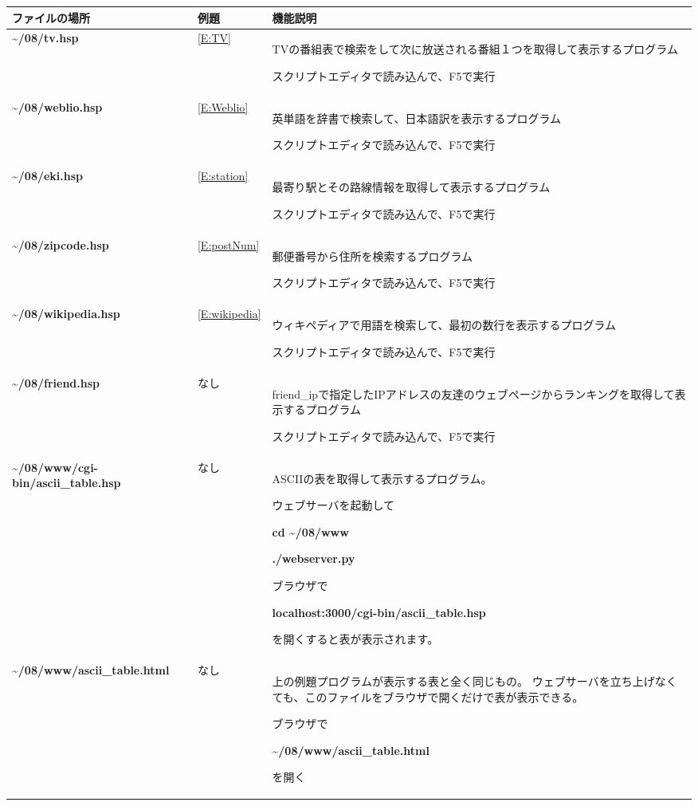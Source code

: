 \documentclass[a4paper,12pt,dvipdfmx]{jarticle}
\begin{document}
\begin{flushleft}
\tablefirsthead{}
\tablehead{}
\tabletail{}
\tablelasttail{}
\begin{supertabular}{|m{6.7730002cm}|m{2.042cm}|m{7.5810003cm}|}
\hline
ファイルの場所 &
例題 &
機能説明\\\hline
	\textbf{\~{}/08/tv.hsp} &
\ref*{E:TV} &
TVの番組表で検索をして次に放送される番組１つを取得して表示するプログラム

スクリプトエディタで読み込んで、F5で実行\\\hline
	\textbf{\~{}/08/weblio.hsp} &
\ref*{E:Weblio} &
英単語を辞書で検索して、日本語訳を表示するプログラム

スクリプトエディタで読み込んで、F5で実行\\\hline
	\textbf{\~{}/08/eki.hsp} &
\ref*{E:station} &
最寄り駅とその路線情報を取得して表示するプログラム

スクリプトエディタで読み込んで、F5で実行\\\hline
	\textbf{\~{}/08/zipcode.hsp} &
\ref*{E:postNum} &
郵便番号から住所を検索するプログラム

スクリプトエディタで読み込んで、F5で実行\\\hline
	\textbf{\~{}/08/wikipedia.hsp} &
\ref*{E:wikipedia} &
ウィキペディアで用語を検索して、最初の数行を表示するプログラム

スクリプトエディタで読み込んで、F5で実行\\\hline
	\textbf{\~{}/08/friend.hsp} &
なし &
friend\_ipで指定したIPアドレスの友達のウェブページからランキングを取得して表示するプログラム

スクリプトエディタで読み込んで、F5で実行\\\hline
	\textbf{\~{}/08/www/cgi-bin/ascii\_table.hsp} &
なし &
ASCIIの表を取得して表示するプログラム。

ウェブサーバを起動して

	\textbf{cd \~{}/08/www}

	\textbf{./webserver.py}

ブラウザで

	\textbf{localhost:3000/cgi-bin/ascii\_table.hsp}

を開くすると表が表示されます。\\\hline
	\textbf{\~{}/08/www/ascii\_table.html} &
なし &
上の例題プログラムが表示する表と全く同じもの。
	ウェブサーバを立ち上げなくても、このファイルをブラウザで開くだけで表が表示できる。

ブラウザで

	\textbf{\~{}/08/www/ascii\_table.html}

を開く\\\hline
\end{supertabular}
\end{flushleft}
\end{document}
